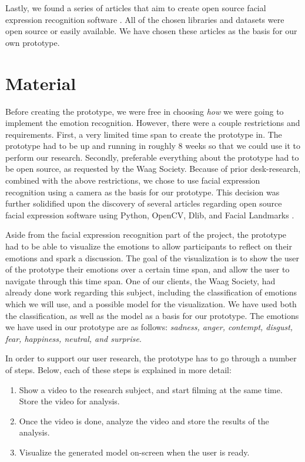 \documentclass[sigconf]{acmart}
\begin{document}
Lastly, we found a series of articles that aim to create open source facial expression recognition software
\cite{gent2016landmarks}. All of the chosen libraries and datasets were open source or easily available.
We have chosen these articles as the basis for our own prototype.


\section{Material}
Before creating the prototype, we were free in choosing \emph{how} we were going to implement the emotion
recognition. However, there were a couple restrictions and requirements. First, a very limited time span
to create the prototype in. The prototype had to be up and running in roughly 8 weeks so that we could
use it to perform our research. Secondly, preferable everything about the prototype had to be open source, as
requested by the Waag Society. Because of prior desk-research, combined with the above restrictions, we
chose to use facial expression recognition using a camera as the basis for our prototype. This decision was
further solidified upon the discovery of several articles regarding open source facial expression software
using Python, OpenCV, Dlib, and Facial Landmarks \cite{gent2016landmarks}.

Aside from the facial expression recognition part of the project, the prototype had to be able to visualize the
emotions to allow participants to reflect on their emotions and spark a discussion. The goal of the
visualization is to show the user of the prototype their emotions over a certain time span, and allow the user
to navigate through this time span. One of our clients, the Waag Society, had already done work regarding
this subject, including the classification of emotions \cite{plutchik1980general} which we will use, 
and a possible model for the visualization. We have used both the classification, as well as the model
as a basis for our prototype. The emotions we have used in our prototype are as follows: \emph{sadness, 
anger, contempt, disgust, fear, happiness, neutral, and surprise}.

In order to support our user research, the prototype has to go through a number of steps. Below, each of these
steps is explained in more detail:
\begin{enumerate}
    \item{Show a video to the research subject, and start filming at the same time. Store the video for analysis.}
    \item{Once the video is done, analyze the video and store the results of the analysis.}
    \item{Visualize the generated model on-screen when the user is ready.}
\end{enumerate}
\end{document}

